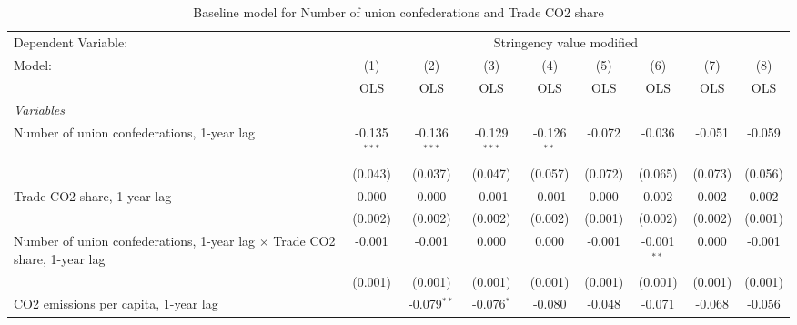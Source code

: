 
\begin{table}[htbp]
   \caption{Baseline model for Number of union confederations and Trade CO2 share}
   \centering
   \begin{tabular}{lcccccccc}
      \toprule
      Dependent Variable: & \multicolumn{8}{c}{Stringency value modified}\\
      Model:                                                                           & (1)            & (2)            & (3)            & (4)           & (5)           & (6)           & (7)           & (8)\\  
                                                                                       &  OLS           & OLS            & OLS            & OLS           & OLS           & OLS           & OLS           & OLS\\  
      \midrule
      \emph{Variables}\\
      Number of union confederations, 1-year lag                                       & -0.135$^{***}$ & -0.136$^{***}$ & -0.129$^{***}$ & -0.126$^{**}$ & -0.072        & -0.036        & -0.051        & -0.059\\   
                                                                                       & (0.043)        & (0.037)        & (0.047)        & (0.057)       & (0.072)       & (0.065)       & (0.073)       & (0.056)\\   
      Trade CO2 share, 1-year lag                                                      & 0.000          & 0.000          & -0.001         & -0.001        & 0.000         & 0.002         & 0.002         & 0.002\\   
                                                                                       & (0.002)        & (0.002)        & (0.002)        & (0.002)       & (0.001)       & (0.002)       & (0.002)       & (0.001)\\   
      Number of union confederations, 1-year lag $\times$ Trade CO2 share, 1-year lag  & -0.001         & -0.001         & 0.000          & 0.000         & -0.001        & -0.001$^{**}$ & 0.000         & -0.001\\   
                                                                                       & (0.001)        & (0.001)        & (0.001)        & (0.001)       & (0.001)       & (0.001)       & (0.001)       & (0.001)\\   
      CO2 emissions per capita, 1-year lag                                             &                & -0.079$^{**}$  & -0.076$^{*}$   & -0.080        & -0.048        & -0.071        & -0.068        & -0.056\\   

\end{tabular}
\end{table}
